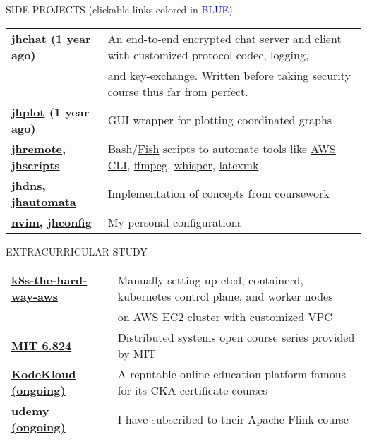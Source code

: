 \documentclass{resume} %
\begin{document}
\begin{rSection}{SIDE PROJECTS (clickable links colored in \textcolor{blue}{BLUE})}

\begin{tabular}{ @{} >{\bfseries}l @{\hspace{6ex}} l }
\href{https://github.com/realzhujunhao/jhchat}{jhchat}
(1 year ago) & An end-to-end encrypted chat server and client with
                      customized protocol codec, logging, \\ 
                    & and key-exchange. Written before taking security course thus far from perfect. \\
\href{https://github.com/realzhujunhao/jhplot}{jhplot}
(1 year ago) & GUI wrapper for plotting coordinated graphs \\
\href{https://github.com/realzhujunhao/jhremote}{jhremote},
\href{https://github.com/realzhujunhao/jhscripts}{jhscripts}
& Bash/\href{https://fishshell.com/}{Fish} scripts to automate tools like
\href{https://aws.amazon.com/cli/}{AWS CLI},
\href{https://github.com/FFmpeg/FFmpeg}{ffmpeg}, 
\href{https://github.com/openai/whisper}{whisper}, 
\href{https://mg.readthedocs.io/latexmk.html}{latexmk}. \\
\href{https://github.com/realzhujunhao/jhdns}{jhdns},
\href{https://github.com/realzhujunhao/jhautomata}{jhautomata}
& Implementation of concepts from coursework \\
\href{https://github.com/realzhujunhao/nvim}{nvim},
\href{https://github.com/realzhujunhao/jhconfig}{jhconfig}
& My personal configurations \\
\end{tabular}

\end{rSection} 

\begin{rSection}{EXTRACURRICULAR STUDY}
\begin{tabular}{ @{} >{\bfseries}l @{\hspace{6ex}} l }
\href{https://github.com/realzhujunhao/kubernetes-the-hard-way-aws}{k8s-the-hard-way-aws}
& Manually setting up etcd, containerd, kubernetes control plane, and worker nodes \\ 
& on AWS EC2 cluster with customized VPC \\
\href{https://www.youtube.com/watch?v=cQP8WApzIQQ&list=PLrw6a1wE39_tb2fErI4-WkMbsvGQk9_UB}{MIT 6.824}
& Distributed systems open course series provided by MIT \\
\href{https://kodekloud.com/}{KodeKloud (ongoing)}
& A reputable online education platform famous for its CKA certificate courses \\
\href{https://www.udemy.com/course/apache-flink-a-real-time-hands-on-course-on-flink}{udemy (ongoing)}
& I have subscribed to their Apache Flink course \\
\end{tabular}
\end{rSection}
\end{document}
